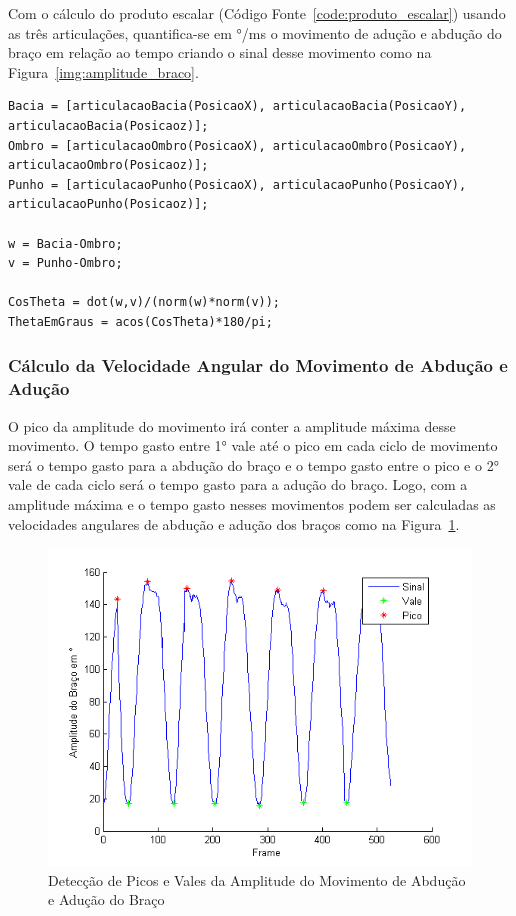 Com o cálculo do produto escalar (Código Fonte~\ref{code:produto_escalar}) usando as três articulações, quantifica-se em °/ms o movimento de adução e abdução do braço em relação ao tempo criando o sinal desse movimento como na Figura~\ref{img:amplitude_braco}.

\lstset{language=Matlab}          %
\begin{lstlisting}[frame=single, caption=Código do Ângulo Relativo por Produto Escalar, label=code:produto_escalar]  % Start your code-block
Bacia = [articulacaoBacia(PosicaoX), articulacaoBacia(PosicaoY), articulacaoBacia(Posicaoz)];
Ombro = [articulacaoOmbro(PosicaoX), articulacaoOmbro(PosicaoY), articulacaoOmbro(Posicaoz)];
Punho = [articulacaoPunho(PosicaoX), articulacaoPunho(PosicaoY), articulacaoPunho(Posicaoz)];

w = Bacia-Ombro;
v = Punho-Ombro;

CosTheta = dot(w,v)/(norm(w)*norm(v));
ThetaEmGraus = acos(CosTheta)*180/pi;
\end{lstlisting}

\subsubsection{Cálculo da Velocidade Angular do Movimento de Abdução e Adução}
O pico da amplitude do movimento irá conter a amplitude máxima desse movimento. O tempo gasto entre 1° vale até o pico em cada ciclo de movimento será o tempo gasto para a abdução do braço e o tempo gasto entre o pico e o 2° vale de cada ciclo será o tempo gasto para a adução do braço. Logo, com a amplitude máxima e o tempo gasto nesses movimentos podem ser calculadas as velocidades angulares de abdução e adução dos braços como na Figura~\ref{img:amplitude_braco_picos_vales}.
\begin{figure}[!htb]
     \centering
     \includegraphics[width=1\textwidth]{./img/amplitude-braco-picos.png}
     \caption{Detecção de Picos e Vales da Amplitude do Movimento de Abdução e Adução do Braço}
     \label{img:amplitude_braco_picos_vales}
\end{figure}

